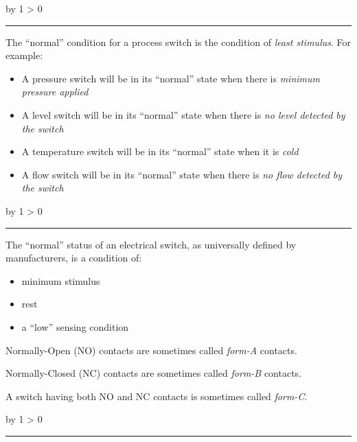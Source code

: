 \documentclass[12pt,a4paper]{article}
\def\oppgave{
            \advance\questnum by 1
            \ifnum \questnum > 0
                 \hrule
                 \vskip 3pt
                 \leftline{Oppgave \the\questnum}
                 \vskip 3pt \fi}
\def\svar{
           \advance\answnum by 1
           \ifnum \answnum > 0
                \hrule
                \vskip 3pt
                \leftline{Svar \the\answnum}
                \vskip 3pt \fi}
\def\notes{
           \advance\explnum by 1
           \ifnum \explnum > 0
                \hrule
                \vskip 3pt
                \leftline{Notes \the\explnum}
                \vskip 3pt \fi}
\begin{document}
\svar{} 

The ``normal'' condition for a process switch is the condition of {\it least stimulus}.  For example:

\vskip 10pt

\begin{itemize}
\item{} A pressure switch will be in its ``normal'' state when there is {\it minimum pressure applied}
\vskip 10pt
\item{} A level switch will be in its ``normal'' state when there is {\it no level detected by the switch}
\vskip 10pt
\item{} A temperature switch will be in its ``normal'' state when it is {\it cold}
\vskip 10pt
\item{} A flow switch will be in its ``normal'' state when there is {\it no flow detected by the switch}
\end{itemize}

\vskip 10pt \filbreak 





\notes{} 

The ``normal'' status of an electrical switch, as universally defined by manufacturers, is a condition of:

\begin{itemize}
\item{} minimum stimulus
\item{} rest
\item{} a ``low'' sensing condition
\end{itemize}

Normally-Open (NO) contacts are sometimes called {\it form-A} contacts.

\vskip 10pt

Normally-Closed (NC) contacts are sometimes called {\it form-B} contacts.

\vskip 10pt

A switch having both NO and NC contacts is sometimes called {\it form-C}.




\vfil \eject 



\oppgave{} 
\end{document}
